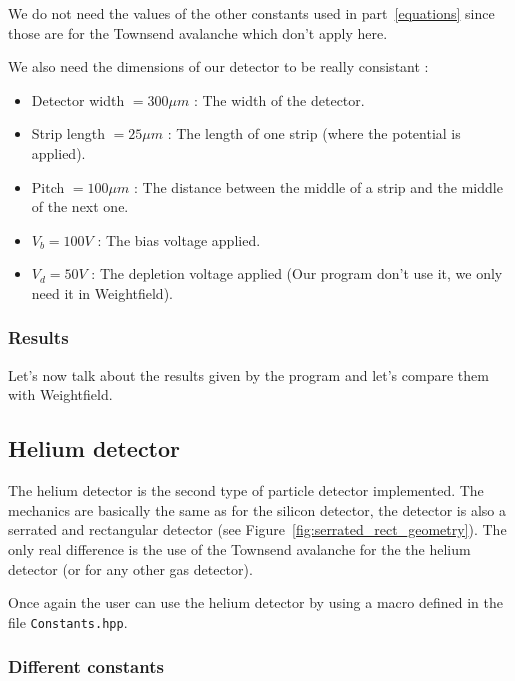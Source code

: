 \documentclass[11pt]{article}
\begin{document}
			We do not need the values of the other constants used in part~\ref{equations} since
			those are for the Townsend avalanche which don't apply here.

			We also need the dimensions of our detector to be really consistant :

			\begin{itemize}

				\item Detector width $= 300 \mu m$ : The width of the detector.
				\item Strip length $= 25 \mu m$ : The length of one strip (where the potential is
					applied).
				\item Pitch $= 100 \mu m$ : The distance between the middle of a strip and the middle
					of the next one.
				\item $V_b = 100 V$ : The bias voltage applied.
				\item $V_d = 50 V$ : The depletion voltage applied (Our program don't use it, we only
					need it in Weightfield).

			\end{itemize}

		\subsubsection*{Results}

			Let's now talk about the results given by the program and let's compare them with Weightfield.

	\subsection{Helium detector}

		The helium detector is the second type of particle detector implemented. The mechanics are basically
		the same as for the silicon detector, the detector is also a serrated and rectangular detector 
		(see Figure~\ref{fig:serrated_rect_geometry}). The only real difference is the use of the Townsend
		avalanche for the the helium detector (or for any other gas detector).

		Once again the user can use the helium detector by using a macro defined in the file
		\texttt{Constants.hpp}.

		\subsubsection*{Different constants}
\end{document}
